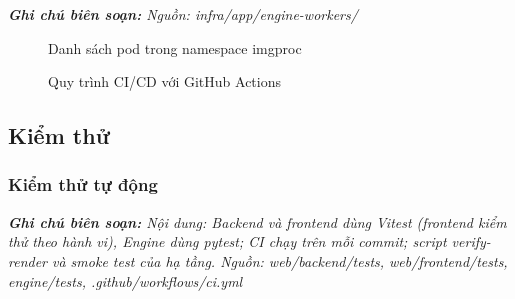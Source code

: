 \documentclass[a4paper,12pt]{article}
\begin{document}
{\small\itshape\noindent\textbf{Ghi chú biên soạn:} Nguồn: infra/app/engine-workers/\par\vspace{6pt}}


\begin{figure}[htbp]
\centering
{}
\caption{Danh sách pod trong namespace imgproc}
\label{fig:5-1}
\end{figure}


\begin{figure}[htbp]
\centering
{}
\caption{Quy trình CI/CD với GitHub Actions}
\label{fig:5-2}
\end{figure}


\subsection{Kiểm thử}


\subsubsection{Kiểm thử tự động}

{\small\itshape\noindent\textbf{Ghi chú biên soạn:} Nội dung: Backend và frontend dùng Vitest (frontend kiểm thử theo hành vi), Engine dùng pytest; CI chạy trên mỗi commit; script verify-render và smoke test của hạ tầng.  Nguồn: web/backend/tests, web/frontend/tests, engine/tests, .github/workflows/ci.yml\par\vspace{6pt}}
\end{document}
